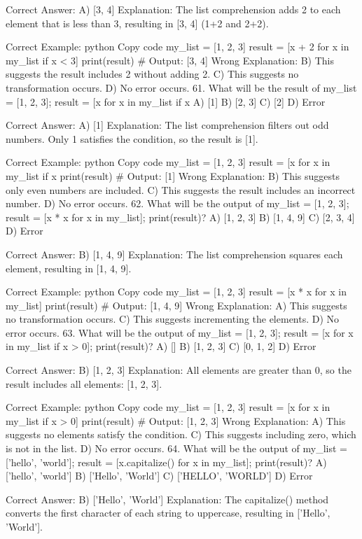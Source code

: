 Correct Answer: A) [3, 4]
Explanation: The list comprehension adds 2 to each element that is less than 3, resulting in [3, 4] (1+2 and 2+2).

Correct Example:
python
Copy code
my_list = [1, 2, 3]
result = [x + 2 for x in my_list if x < 3]
print(result)  # Output: [3, 4]
Wrong Explanation:
B) This suggests the result includes 2 without adding 2.
C) This suggests no transformation occurs.
D) No error occurs.
61. What will be the result of my_list = [1, 2, 3]; result = [x for x in my_list if x %
A) [1]
B) [2, 3]
C) [2]
D) Error

Correct Answer: A) [1]
Explanation: The list comprehension filters out odd numbers. Only 1 satisfies the condition, so the result is [1].

Correct Example:
python
Copy code
my_list = [1, 2, 3]
result = [x for x in my_list if x %
print(result)  # Output: [1]
Wrong Explanation:
B) This suggests only even numbers are included.
C) This suggests the result includes an incorrect number.
D) No error occurs.
62. What will be the output of my_list = [1, 2, 3]; result = [x * x for x in my_list]; print(result)?
A) [1, 2, 3]
B) [1, 4, 9]
C) [2, 3, 4]
D) Error

Correct Answer: B) [1, 4, 9]
Explanation: The list comprehension squares each element, resulting in [1, 4, 9].

Correct Example:
python
Copy code
my_list = [1, 2, 3]
result = [x * x for x in my_list]
print(result)  # Output: [1, 4, 9]
Wrong Explanation:
A) This suggests no transformation occurs.
C) This suggests incrementing the elements.
D) No error occurs.
63. What will be the output of my_list = [1, 2, 3]; result = [x for x in my_list if x > 0]; print(result)?
A) []
B) [1, 2, 3]
C) [0, 1, 2]
D) Error

Correct Answer: B) [1, 2, 3]
Explanation: All elements are greater than 0, so the result includes all elements: [1, 2, 3].

Correct Example:
python
Copy code
my_list = [1, 2, 3]
result = [x for x in my_list if x > 0]
print(result)  # Output: [1, 2, 3]
Wrong Explanation:
A) This suggests no elements satisfy the condition.
C) This suggests including zero, which is not in the list.
D) No error occurs.
64. What will be the output of my_list = ['hello', 'world']; result = [x.capitalize() for x in my_list]; print(result)?
A) ['hello', 'world']
B) ['Hello', 'World']
C) ['HELLO', 'WORLD']
D) Error

Correct Answer: B) ['Hello', 'World']
Explanation: The capitalize() method converts the first character of each string to uppercase, resulting in ['Hello', 'World'].

